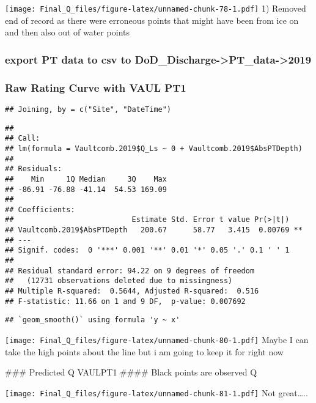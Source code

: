 \documentclass[
]{article}
\begin{document}
\texttt{[image: Final\_Q\_files/figure-latex/unnamed-chunk-78-1.pdf]} 1)
Removed end of record as there were erroneous points that might have
been from ice on and then also out of water points

\hypertarget{export-pt-data-to-csv-to-dod_discharge-pt_data-2019-3}{%
\subsubsection{export PT data to csv to
DoD\_Discharge-\textgreater PT\_data-\textgreater2019}\label{export-pt-data-to-csv-to-dod_discharge-pt_data-2019-3}}

\hypertarget{raw-rating-curve-with-vaul-pt1}{%
\subsubsection{Raw Rating Curve with VAUL
PT1}\label{raw-rating-curve-with-vaul-pt1}}

\begin{verbatim}
## Joining, by = c("Site", "DateTime")
\end{verbatim}

\begin{verbatim}
## 
## Call:
## lm(formula = Vaultcomb.2019$Q_Ls ~ 0 + Vaultcomb.2019$AbsPTDepth)
## 
## Residuals:
##    Min     1Q Median     3Q    Max 
## -86.91 -76.88 -41.14  54.53 169.09 
## 
## Coefficients:
##                           Estimate Std. Error t value Pr(>|t|)   
## Vaultcomb.2019$AbsPTDepth   200.67      58.77   3.415  0.00769 **
## ---
## Signif. codes:  0 '***' 0.001 '**' 0.01 '*' 0.05 '.' 0.1 ' ' 1
## 
## Residual standard error: 94.22 on 9 degrees of freedom
##   (12731 observations deleted due to missingness)
## Multiple R-squared:  0.5644, Adjusted R-squared:  0.516 
## F-statistic: 11.66 on 1 and 9 DF,  p-value: 0.007692
\end{verbatim}

\begin{verbatim}
## `geom_smooth()` using formula 'y ~ x'
\end{verbatim}

\texttt{[image: Final\_Q\_files/figure-latex/unnamed-chunk-80-1.pdf]}
Maybe I can take the high points about the line but i am going to keep
it for right now

\#\#\# Predicted Q VAULPT1 \#\#\#\# Black points are observed Q

\texttt{[image: Final\_Q\_files/figure-latex/unnamed-chunk-81-1.pdf]} Not
great\ldots..
\end{document}
